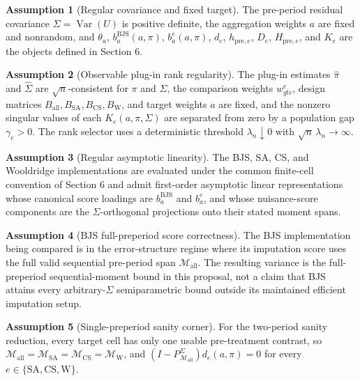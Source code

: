 \documentclass[11pt]{article}
\theoremstyle{definition}
\newtheorem{assumption}{Assumption}
\theoremstyle{plain}
\theoremstyle{remark}
\begin{document}
\begin{assumption}[Regular covariance and fixed target]\label{ass:regular-covariance}
The pre-period residual covariance \(\Sigma=\operatorname{Var}(U)\) is positive
definite, the aggregation weights \(a\) are fixed and nonrandom, and
\(\theta_a\), \(b_a^{\mathrm{BJS}}(a,\pi)\), \(b_a^e(a,\pi)\), \(d_e\),
\(h_{\mathrm{pre},e}\), \(D_e\), \(H_{\mathrm{pre},e}\), and \(K_e\) are the
objects defined in Section 6.
\end{assumption}

\begin{assumption}[Observable plug-in rank regularity]\label{ass:plugin-rank}
The plug-in estimates \(\widehat\pi\) and \(\widehat\Sigma\) are
\(\sqrt n\)-consistent for \(\pi\) and \(\Sigma\), the comparison weights
\(w^e_{gtc}\), design matrices
\(B_{\mathrm{all}},B_{\mathrm{SA}},B_{\mathrm{CS}},B_{\mathrm{W}}\), and
target weights \(a\) are fixed, and the nonzero singular values of each
\(K_e(a,\pi,\Sigma)\) are separated from zero by a population
gap \(\gamma_e>0\).  The rank selector uses a deterministic threshold
\(\lambda_n\downarrow0\) with \(\sqrt n\,\lambda_n\to\infty\).
\end{assumption}

\begin{assumption}[Regular asymptotic linearity]\label{ass:regular-if}
The BJS, SA, CS, and Wooldridge implementations are evaluated under the common
finite-cell convention of Section 6 and admit first-order asymptotic linear
representations whose canonical score loadings are
\(b_a^{\mathrm{BJS}}\) and \(b_a^e\), and whose nuisance-score components are
the \(\Sigma\)-orthogonal projections onto their stated moment spans.
\end{assumption}

\begin{assumption}[BJS full-preperiod score correctness]\label{ass:bjs-full-score}
The BJS implementation being compared is in the error-structure regime where
its imputation score uses the full valid sequential pre-period span
\(\mathcal M_{\mathrm{all}}\).  The resulting variance is the full-preperiod
sequential-moment bound in this proposal, not a claim that BJS attains every
arbitrary-\(\Sigma\) semiparametric bound outside its maintained efficient
imputation setup.
\end{assumption}

\begin{assumption}[Single-preperiod sanity corner]\label{ass:single-preperiod}
For the two-period sanity reduction, every target cell has only one usable
pre-treatment contrast, so
\(\mathcal M_{\mathrm{all}}=\mathcal M_{\mathrm{SA}}=\mathcal M_{\mathrm{CS}}
=\mathcal M_{\mathrm{W}}\), and
\((I-P_{\mathcal M_{\mathrm{all}}}^{\Sigma})d_e(a,\pi)=0\) for every
\(e\in\{\mathrm{SA},\mathrm{CS},\mathrm{W}\}\).
\end{assumption}
\end{document}
